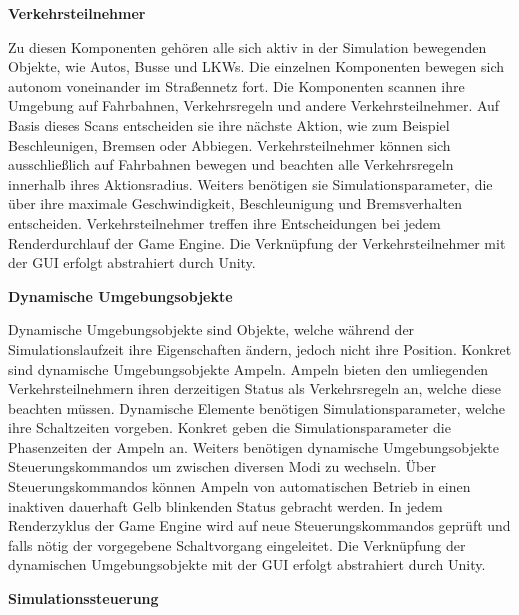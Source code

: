 \begin{flushleft}
\textbf{Verkehrsteilnehmer}
\end{flushleft}
\vspace{-0.3 cm}

Zu diesen Komponenten gehören alle sich aktiv in der Simulation bewegenden Objekte, wie Autos, Busse und LKWs. Die einzelnen Komponenten bewegen sich autonom voneinander im Straßennetz fort. Die Komponenten scannen ihre Umgebung auf Fahrbahnen, Verkehrsregeln und andere Verkehrsteilnehmer. Auf Basis dieses Scans entscheiden sie ihre nächste Aktion, wie zum Beispiel Beschleunigen, Bremsen oder Abbiegen. Verkehrsteilnehmer können sich ausschließlich auf Fahrbahnen bewegen und beachten alle Verkehrsregeln innerhalb ihres Aktionsradius. Weiters benötigen sie Simulationsparameter, die über ihre maximale Geschwindigkeit, Beschleunigung und Bremsverhalten entscheiden. Verkehrsteilnehmer treffen ihre Entscheidungen bei jedem Renderdurchlauf der Game Engine. Die Verknüpfung der Verkehrsteilnehmer mit der GUI erfolgt abstrahiert durch Unity.

\begin{flushleft}
\textbf{Dynamische Umgebungsobjekte}
\end{flushleft}
\vspace{-0.3 cm}

Dynamische Umgebungsobjekte sind Objekte, welche während der Simulationslaufzeit ihre Eigenschaften ändern, jedoch nicht ihre Position. Konkret sind dynamische Umgebungsobjekte Ampeln. Ampeln bieten den umliegenden Verkehrsteilnehmern ihren derzeitigen Status als Verkehrsregeln an, welche diese beachten müssen. Dynamische Elemente benötigen Simulationsparameter, welche ihre Schaltzeiten vorgeben. Konkret geben die Simulationsparameter die Phasenzeiten der Ampeln an. Weiters benötigen dynamische Umgebungsobjekte Steuerungskommandos um zwischen diversen Modi zu wechseln. Über Steuerungskommandos können Ampeln von automatischen Betrieb in einen inaktiven dauerhaft Gelb blinkenden Status gebracht werden. In jedem Renderzyklus der Game Engine wird auf neue Steuerungskommandos geprüft und falls nötig der vorgegebene Schaltvorgang eingeleitet. Die Verknüpfung der dynamischen Umgebungsobjekte mit der GUI erfolgt abstrahiert durch Unity.

\begin{flushleft}
\textbf{Simulationssteuerung}
\end{flushleft}
\vspace{-0.3 cm}


